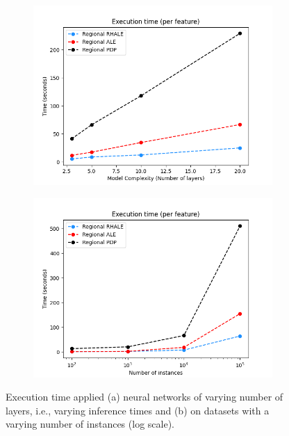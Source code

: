 \documentclass[
twocolumn,
]{ceurart}
\begin{document}
\begin{figure}
  \centering
  \begin{subfigure}[t]{0.24\textwidth}
  \centering
  \includegraphics[width=\linewidth]{submission-tadaVLDB/latex/figures/simulation_2/efficiency_layers.png}
  \caption{}
  \label{subfig:pairwise}
  \end{subfigure}
  \begin{subfigure}[t]{0.24\textwidth}
  \centering
  \includegraphics[width=\linewidth]{submission-tadaVLDB/latex/figures/simulation_2/efficiency_samples.png}
  \caption{}
  \label{subfig:global}
  \end{subfigure}
  \caption{Execution time applied (a) neural networks of varying number of layers, i.e., varying inference times and (b) on datasets with a varying number of instances (log scale).}
\end{figure}
\end{document}
